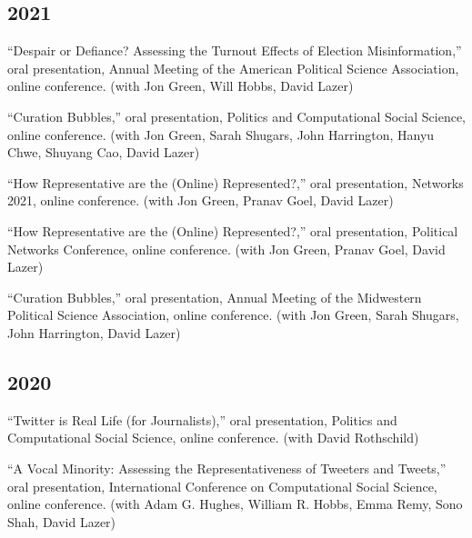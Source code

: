 \documentclass[11pt, letter]{article}
\begin{document}
\subsection{2021}
\begin{hangparas}{.25in}{1}
``Despair or Defiance? Assessing the Turnout Effects of Election Misinformation,'' oral presentation, Annual Meeting of the American Political Science Association, online conference. (with Jon Green, Will Hobbs, David Lazer)
\vspace{2mm}

``Curation Bubbles,'' oral presentation, Politics and Computational Social Science, online conference. (with Jon Green, Sarah Shugars, John Harrington, Hanyu Chwe, Shuyang Cao, David Lazer)
\vspace{2mm}

``How Representative are the (Online) Represented?,'' oral presentation, Networks 2021, online conference. (with Jon Green, Pranav Goel, David Lazer)
\vspace{2mm}

``How Representative are the (Online) Represented?,'' oral presentation, Political Networks Conference, online conference. (with Jon Green, Pranav Goel, David Lazer)
\vspace{2mm}

``Curation Bubbles,'' oral presentation, Annual Meeting of the Midwestern Political Science Association, online conference. (with Jon Green, Sarah Shugars, John Harrington, David Lazer)
\vspace{2mm}
\end{hangparas}

\subsection{2020}
\begin{hangparas}{.25in}{1}
``Twitter is Real Life (for Journalists),'' oral presentation, Politics and Computational Social Science, online conference. (with David Rothschild)
\vspace{2mm}

``A Vocal Minority: Assessing the Representativeness of Tweeters and Tweets,'' oral presentation, International Conference on Computational Social Science, online conference. (with Adam G. Hughes, William R. Hobbs, Emma Remy, Sono Shah, David Lazer)
\vspace{2mm}
\end{hangparas}
\end{document}
